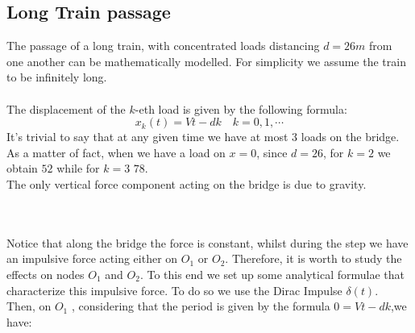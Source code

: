 \documentclass[10pt,a4paper,final]{report}
\begin{document}
\subsection{Long Train passage}
The passage of a long train, with concentrated loads distancing $d=26m$ from one another can be mathematically modelled. For simplicity we assume the train to be infinitely long.\\ \\
The displacement of the $k$-eth load is given by the following formula:
$$x_{k}(t) = Vt-dk \quad k=0,1,\cdots$$
It's trivial to say that at any given time we have at most 3 loads on the bridge. As a matter of fact, when we have a load on $x=0$, since $d=26$, for $k=2$ we obtain $52$ while for $k=3$ $78$. \\
The only vertical force component acting on the bridge is due to gravity. \\ \\
\\
Notice that along the bridge the force is constant, whilst during the step we have an impulsive force acting either on $O_{1}$ or $O_{2}$.
Therefore, it is worth to study the effects on nodes $O_{1}$ and $O_{2}$. To this end we set up some analytical formulae that characterize this impulsive force. To do so we use the Dirac Impulse $\delta (t)$.
\\
Then, on $O_{1}$ , considering that the period is given by the formula $0=Vt-dk$,we have:
\end{document}
